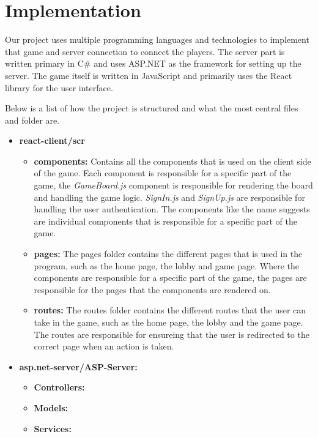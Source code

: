\documentclass[ twoside,openright,titlepage,numbers=noenddot,headinclude,%
                footinclude=true,cleardoublepage=empty,abstractoff, %
                BCOR=5mm,paper=a4,fontsize=11pt,%
                ngerman,american,%
                ]{scrreprt}
\begin{document}
\section{Implementation}
Our project uses multiple programming languages and technologies to implement that game and server connection to connect the players. The server part is written primary in C\# and uses ASP.NET as the framework for setting up the server. The game itself is written in JavaScript and primarily uses the React library for the user interface.

Below is a list of how the project is structured and what the most central files and folder are.
\begin{itemize}
  \item \textbf{react-client/scr}
  \begin{itemize}
    \item \textbf{components:} Contains all the components that is used on the client side of the game. Each component is responsible for a specific part of the game, the \textit{GameBoard.js} component is responsible for rendering the board and handling the game logic. \textit{SignIn.js} and \textit{SignUp.js} are responsible for handling the user authentication. The components like the name suggests are individual components that is responsible for a specific part of the game. 
    \item \textbf{pages:} The pages folder contains the different pages that is used in the program, such as the home page, the lobby and game page. Where the components are responsible for a specific part of the game, the pages are responsible for the pages that the components are rendered on.
    \item \textbf{routes:} The routes folder contains the different routes that the user can take in the game, such as the home page, the lobby and the game page. The routes are responsible for ensureing that the user is redirected to the correct page when an action is taken.
  \end{itemize}
  \item \textbf{asp.net-server/ASP-Server:}
  \begin{itemize}
    \item \textbf{Controllers:}
    \item \textbf{Models:}
    \item \textbf{Services:}
    \end{itemize}
\end{itemize}
\end{document}
